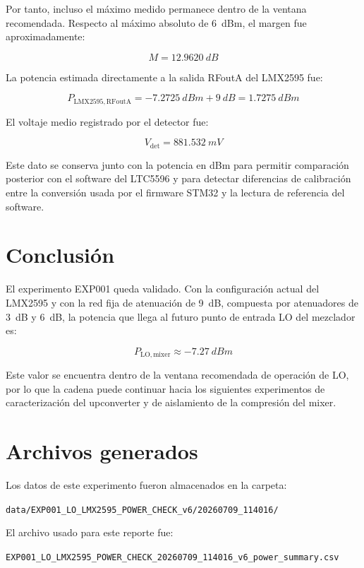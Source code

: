 \documentclass[12pt,a4paper]{article}
\begin{document}
Por tanto, incluso el máximo medido permanece dentro de la ventana recomendada. Respecto al máximo absoluto de \SI{6}{dBm}, el margen fue aproximadamente:

\begin{equation}
M = \SI{12.9620}{dB}
\end{equation}

La potencia estimada directamente a la salida RFoutA del LMX2595 fue:

\begin{equation}
P_{\mathrm{LMX2595,RFoutA}} =
\SI{-7.2725}{dBm} + \SI{9}{dB}
=
\SI{1.7275}{dBm}
\end{equation}

El voltaje medio registrado por el detector fue:

\begin{equation}
V_{\mathrm{det}} = \SI{881.532}{mV}
\end{equation}

Este dato se conserva junto con la potencia en dBm para permitir comparación posterior con el software del LTC5596 y para detectar diferencias de calibración entre la conversión usada por el firmware STM32 y la lectura de referencia del software.

\section{Conclusión}

El experimento EXP001 queda validado. Con la configuración actual del LMX2595 y con la red fija de atenuación de \SI{9}{dB}, compuesta por atenuadores de \SI{3}{dB} y \SI{6}{dB}, la potencia que llega al futuro punto de entrada LO del mezclador es:

\begin{equation}
P_{\mathrm{LO,mixer}} \approx \SI{-7.27}{dBm}
\end{equation}

Este valor se encuentra dentro de la ventana recomendada de operación de LO, por lo que la cadena puede continuar hacia los siguientes experimentos de caracterización del upconverter y de aislamiento de la compresión del mixer.

\section{Archivos generados}

Los datos de este experimento fueron almacenados en la carpeta:

\begin{center}
\texttt{data/EXP001\_LO\_LMX2595\_POWER\_CHECK\_v6/20260709\_114016/}
\end{center}

El archivo usado para este reporte fue:

\begin{center}
\texttt{EXP001\_LO\_LMX2595\_POWER\_CHECK\_20260709\_114016\_v6\_power\_summary.csv}
\end{center}
\end{document}
